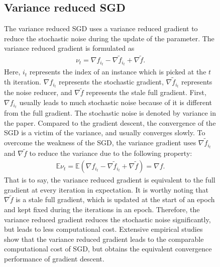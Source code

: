 \documentclass[preprint,review,11pt,a4paper]{elsarticle}
\begin{document}
\begin{figure}
\subsection{Variance reduced SGD}
The variance reduced SGD uses a variance reduced gradient to reduce the stochastic noise during the update of the parameter. The variance reduced gradient is formulated as 
\begin{equation}
\label{equa_vr_gradient}
\begin{array}{ll}
\nu_t = \nabla f_{i_t} - \nabla \tilde{f}_{i_t} + \nabla \tilde{f}.
\end{array}
\end{equation} Here, $i_t$ represents the index of an instance which is picked at the $t$th iteration. $\nabla f_{i_t}$ represents the stochastic gradient, $\nabla \tilde{f}_{i_t}$ represents the noise reducer, and $\nabla \tilde{f}$ represents  the stale full gradient. First, $\nabla f_{i_t}$ usually leads to much stochastic noise because of it is different from the full gradient. The stochastic noise is denoted by variance in the paper. Compared to the gradient descent, the convergence of the SGD is a  victim of the variance, and usually converges slowly. To overcome the weakness of the SGD, the variance gradient uses $\nabla \tilde{f}_{i_t}$ and  $\nabla \tilde{f}$ to reduce the variance due to the following property:
\begin{equation}
\label{equa_vr_gradient}
\begin{array}{ll}
\mathbb{E}\nu_t = \mathbb{E}(\nabla f_{i_t} - \nabla \tilde{f}_{i_t} + \nabla \tilde{f}) = \nabla f.
\end{array}
\end{equation} That is to say, the variance reduced gradient is equivalent to the full gradient at every iteration in expectation. It is worthy noting that $\nabla \tilde{f}$ is a stale full gradient, which is updated at the start of an epoch and kept fixed during the iterations in an epoch.  Therefore, the variance reduced gradient reduces the stochastic noise significantly, but leads to less computational cost. Extensive empirical studies show that the variance reduced gradient leads to the comparable computational cost of SGD, but obtains the equivalent convergence performance of gradient descent.



\end{figure}
\end{document}
